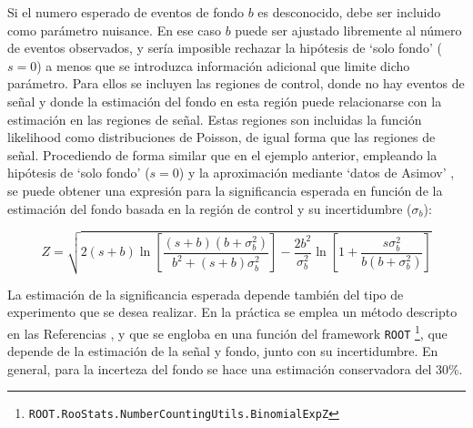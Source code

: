 Si el numero esperado de eventos de fondo $b$ es desconocido, debe ser incluido como parámetro nuisance. En ese caso $b$ puede ser ajustado libremente al número de eventos observados, y sería imposible rechazar la hipótesis de `solo fondo' ($s=0$) a menos que se introduzca información adicional que limite dicho parámetro. Para ellos se incluyen las regiones de control, donde no hay eventos de señal y donde la estimación del fondo en esta región puede relacionarse con la estimación en las regiones de señal. Estas regiones son incluidas la función likelihood como distribuciones de Poisson, de igual forma que las regiones de señal. Procediendo de forma similar que en el ejemplo anterior, empleando la  hipótesis de `solo fondo' ($s=0$) y la aproximación mediante `datos de Asimov' \cite{Cowan:2010js}, se puede obtener una expresión para la significancia esperada en función de la estimación del fondo basada en la región de control y su incertidumbre ($\sigma_b$):

\begin{equation}
	Z = \sqrt{ 2 (s+b) \ln{\left[ \frac{(s+b)(b+\sigma_b^2)}{b^2 + (s+b)\sigma_b^2} \right]} - \frac{2 b^2}{\sigma_b^2} \ln{ \left[ 1 + \frac{s \sigma_b^2}{b(b+\sigma_b^2)} \right] } }
\end{equation}

La estimación de la significancia esperada depende también del tipo de experimento que se desea realizar. En la práctica se emplea un método descripto en las Referencias \cite{Linnemann:2003vw, stat_1, ATL-PHYS-PUB-2020-025}, y que se engloba en una función del framework \texttt{ROOT} \footnote{\texttt{ROOT.RooStats.NumberCountingUtils.BinomialExpZ}}, que depende de la estimación de la señal y fondo, junto con su incertidumbre. En general, para la incerteza del fondo se hace una estimación conservadora del 30\%. 

